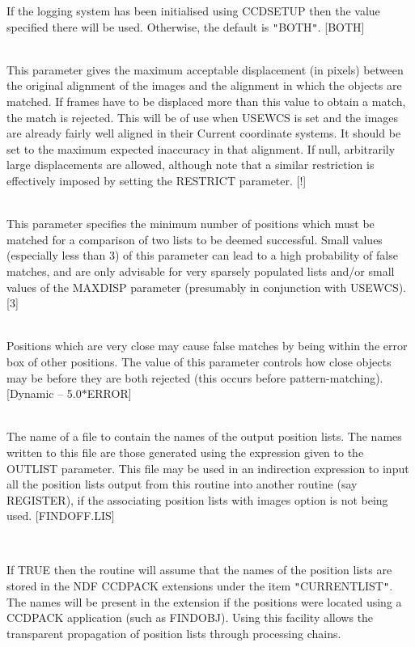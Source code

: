 \documentclass[twoside,11pt]{article}
\newcommand{\htmlref}[2]{#1}
\renewcommand{\_}{\texttt{\symbol{95}}}
\newcommand{\qt}[1]{{\tt "}#1{\tt "}}
\newcommand{\xroutine}[1]{\htmlref{{\sc #1}}{#1}}
\newcommand{\sstsubsection}[1]{ \item[{#1}] \mbox{} \\}
\newcommand{\sstsubsection}[1]{\item[{#1}]}
\begin{document}
{{{{         }
         If the logging system has been initialised using \xroutine{CCDSETUP}
         then the value specified there will be used. Otherwise, the
         default is \qt{BOTH}.
         [BOTH]
      }
      \sstsubsection{
         MAXDISP = \_DOUBLE (Read)
      } {
         This parameter gives the maximum acceptable displacement
         (in pixels) between the original alignment of the images and the
         alignment in which the objects are matched.  If frames have
         to be displaced more than this value to obtain a match, the
         match is rejected.  This will be of use when USEWCS is set
         and the images are already fairly well aligned in their Current
         coordinate systems.  It should be set to the maximum
         expected inaccuracy in that alignment.  If null, arbitrarily
         large displacements are allowed, although note that a
         similar restriction is effectively imposed by setting the
         RESTRICT parameter.
         [!]
      }
      \sstsubsection{
         MINMATCH = \_INTEGER (Read)
      } {
         This parameter specifies the minimum number of positions
         which must be matched for a comparison of two lists to be
         deemed successful. Small values (especially less than 3) of
         this parameter can lead to a high probability of false matches,
         and are only advisable for very sparsely populated lists
         and/or small values of the MAXDISP parameter (presumably in
         conjunction with USEWCS).
         [3]
      }
      \sstsubsection{
         MINSEP = \_DOUBLE (Read)
      } {
         Positions which are very close may cause false matches by being
         within the error box of other positions. The value of this
         parameter controls how close objects may be before they are
         both rejected (this occurs before pattern-matching).
         [Dynamic -- 5.0$*$ERROR]
      }
      \sstsubsection{
         NAMELIST = LITERAL (Read)
      } {
         The name of a file to contain the names of the output
         position lists. The names written to this file are those
         generated using the expression given to the OUTLIST parameter.
         This file may be used in an indirection expression to input
         all the position lists output from this routine into another
         routine (say \xroutine{REGISTER}), if the associating position lists with
         images option is not being used.
         [FINDOFF.LIS]
      }
      \sstsubsection{
         NDFNAMES = \_LOGICAL (Read)
      } {
         If TRUE then the routine will assume that the names of the
         position lists are stored in the NDF CCDPACK extensions under
         the item \qt{CURRENT\_LIST}. The names will be present in the
         extension if the positions were located using a CCDPACK
         application (such as \xroutine{FINDOBJ}). Using this facility allows the
         transparent propagation of position lists through processing
         chains.

}}}
\end{document}
